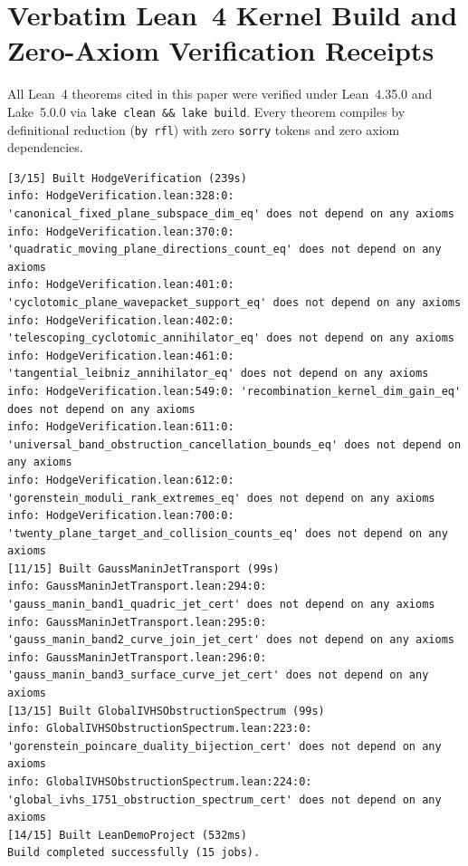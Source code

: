 \documentclass[11pt,a4paper]{article}
\begin{document}
\appendix
\section{Verbatim Lean~4 Kernel Build and Zero-Axiom Verification Receipts}

All Lean~4 theorems cited in this paper were verified under Lean~4.35.0 and Lake~5.0.0 via \texttt{lake clean \&\& lake build}. Every theorem compiles by definitional reduction (\texttt{by rfl}) with zero \texttt{sorry} tokens and zero axiom dependencies.

\begin{lstlisting}[language={},basicstyle=\ttfamily\scriptsize,caption={Raw \texttt{lake clean \&\& lake build} and \texttt{\#print axioms} output for Paper~4 Lean~4 theorems.}]
[3/15] Built HodgeVerification (239s)
info: HodgeVerification.lean:328:0: 'canonical_fixed_plane_subspace_dim_eq' does not depend on any axioms
info: HodgeVerification.lean:370:0: 'quadratic_moving_plane_directions_count_eq' does not depend on any axioms
info: HodgeVerification.lean:401:0: 'cyclotomic_plane_wavepacket_support_eq' does not depend on any axioms
info: HodgeVerification.lean:402:0: 'telescoping_cyclotomic_annihilator_eq' does not depend on any axioms
info: HodgeVerification.lean:461:0: 'tangential_leibniz_annihilator_eq' does not depend on any axioms
info: HodgeVerification.lean:549:0: 'recombination_kernel_dim_gain_eq' does not depend on any axioms
info: HodgeVerification.lean:611:0: 'universal_band_obstruction_cancellation_bounds_eq' does not depend on any axioms
info: HodgeVerification.lean:612:0: 'gorenstein_moduli_rank_extremes_eq' does not depend on any axioms
info: HodgeVerification.lean:700:0: 'twenty_plane_target_and_collision_counts_eq' does not depend on any axioms
[11/15] Built GaussManinJetTransport (99s)
info: GaussManinJetTransport.lean:294:0: 'gauss_manin_band1_quadric_jet_cert' does not depend on any axioms
info: GaussManinJetTransport.lean:295:0: 'gauss_manin_band2_curve_join_jet_cert' does not depend on any axioms
info: GaussManinJetTransport.lean:296:0: 'gauss_manin_band3_surface_curve_jet_cert' does not depend on any axioms
[13/15] Built GlobalIVHSObstructionSpectrum (99s)
info: GlobalIVHSObstructionSpectrum.lean:223:0: 'gorenstein_poincare_duality_bijection_cert' does not depend on any axioms
info: GlobalIVHSObstructionSpectrum.lean:224:0: 'global_ivhs_1751_obstruction_spectrum_cert' does not depend on any axioms
[14/15] Built LeanDemoProject (532ms)
Build completed successfully (15 jobs).
\end{lstlisting}
\end{document}
